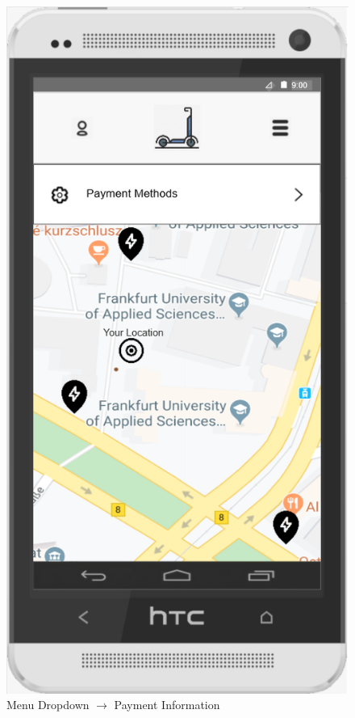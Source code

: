 \documentclass[a4paper, 12pt]{article}
\begin{document}
\begin{figure} [htbp]
  \begin{center}
    \includegraphics[scale=0.75]{images/prototypes/02-02-menu-dropdown--payment-information.png}
  \end{center}
  \caption{Menu Dropdown $\rightarrow$ Payment Information}
\end{figure}
\end{document}
